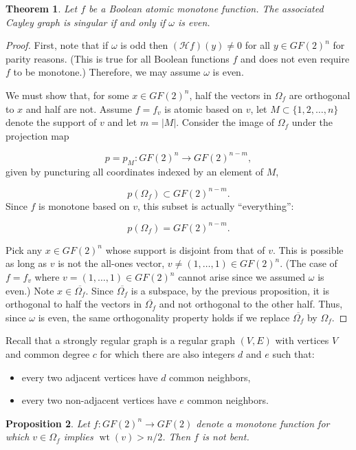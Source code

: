 \documentclass[12pt]{article}
\newtheorem{theorem}{Theorem}
\newtheorem{proposition}[theorem]{Proposition}
\newcommand{\wt}{\mathop{wt}}
\begin{document}
\begin{theorem}
Let $f$ be a Boolean atomic monotone function.
The associated Cayley graph is singular if and only if
$\omega$ is even.

\end{theorem}

\begin{proof}
First, note that if $\omega$ is odd then
$({\mathcal{H}}f) (y)\not= 0$ for all $y\in GF(2)^n$ for parity
reasons.
(This is true for all Boolean functions $f$ and does not even require
$f$ to be monotone.)
Therefore, we may assume $\omega$ is even.

We must show that, for some $x\in GF(2)^n$, half the vectors in
$\Omega_f$ are orthogonal to $x$ and half are not.
Assume $f = f_v$ is atomic based on $v$,
let $M\subset \{1,2,\dots, n\}$ denote the support of
$v$ and let $m=|M|$.
Consider the image of $\Omega_f$ under the
projection map

\[
p = p_M: GF(2)^n \to GF(2)^{n-m},
\]
given by puncturing all coordinates
indexed by an element of $M$,

\[
p(\Omega_f)\subset GF(2)^{n-m}.
\]
Since $f$ is monotone based on $v$, this subset is actually
``everything'':

\[
p(\Omega_f) = GF(2)^{n-m}.
\]

Pick any $x\in GF(2)^n$ whose support is disjoint from
that of $v$. This is possible as long as $v$ is not the all-ones vector,
$v\not= (1,\dots, 1)\in GF(2)^n$.
(The case of $f=f_v$ where $v= (1,\dots, 1)\in GF(2)^n$
cannot arise since we assumed $\omega$ is even.)
Note $x\in \overline{\Omega_f}$. Since $\overline{\Omega_f}$
is a subspace, by the previous proposition, it is orthogonal
to half the vectors in $\overline{\Omega_f}$ and not orthogonal
to the other half. Thus, since $\omega$ is
even, the same orthogonality property
holds if we replace $\overline{\Omega_f}$ by
$\Omega_f$.
\end{proof}

Recall that a strongly regular graph is a
regular graph $(V,E)$ with vertices $V$ and common degree $c$
for which there are also integers $d$ and $e$ such that:
\begin{itemize}
\item
every two adjacent vertices have $d$ common neighbors,
\item
every two non-adjacent vertices have $e$ common neighbors.
\end{itemize}

\begin{proposition}
Let $f:GF(2)^n\to GF(2)$ denote a monotone function for which
$v\in \Omega_f$ implies $\wt(v)>n/2$.
Then $f$ is not bent.
\end{proposition}
\end{document}
